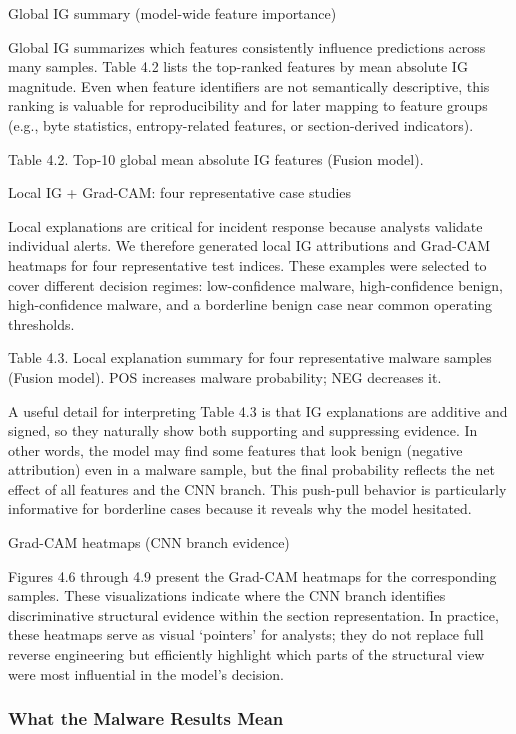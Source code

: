 \documentclass[conference]{IEEEtran}
\begin{document}
Global IG summary (model-wide feature importance)

Global IG summarizes which features consistently influence predictions across many samples. Table 4.2 lists the top-ranked features by mean absolute IG magnitude. Even when feature identifiers are not semantically descriptive, this ranking is valuable for reproducibility and for later mapping to feature groups (e.g., byte statistics, entropy-related features, or section-derived indicators).

Table 4.2. Top-10 global mean absolute IG features (Fusion model).

Local IG + Grad-CAM: four representative case studies

Local explanations are critical for incident response because analysts validate individual alerts. We therefore generated local IG attributions and Grad-CAM heatmaps for four representative test indices. These examples were selected to cover different decision regimes: low-confidence malware, high-confidence benign, high-confidence malware, and a borderline benign case near common operating thresholds.

Table 4.3. Local explanation summary for four representative malware samples (Fusion model). POS increases malware probability; NEG decreases it.

A useful detail for interpreting Table 4.3 is that IG explanations are additive and signed, so they naturally show both supporting and suppressing evidence. In other words, the model may find some features that look benign (negative attribution) even in a malware sample, but the final probability reflects the net effect of all features and the CNN branch. This push-pull behavior is particularly informative for borderline cases because it reveals why the model hesitated.

Grad-CAM heatmaps (CNN branch evidence)

Figures 4.6 through 4.9 present the Grad-CAM heatmaps for the corresponding samples. These visualizations indicate where the CNN branch identifies discriminative structural evidence within the section representation. In practice, these heatmaps serve as visual ‘pointers’ for analysts; they do not replace full reverse engineering but efficiently highlight which parts of the structural view were most influential in the model’s decision.

\subsubsection{What the Malware Results Mean}
\end{document}
